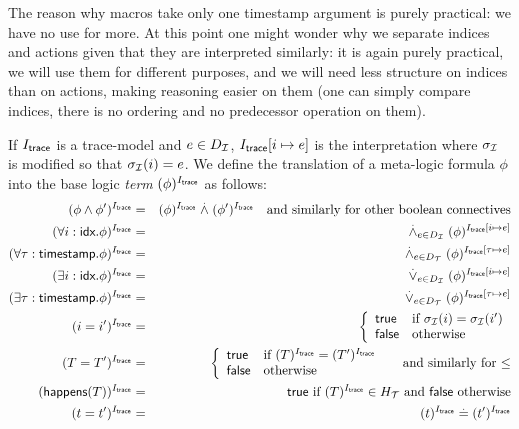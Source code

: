 The reason why macros take only one timestamp argument is purely practical:
we have no use for more. At this point one might wonder why we separate
indices and actions given that they are interpreted similarly: it is again
purely practical, we will use them for different purposes, and we will need
less structure on indices than on actions, making reasoning easier on them
(one can simply compare indices, there is no ordering and no predecessor
operation on them).

\begin{definition}
  If $I_{\textsf{trace}}$ is a trace-model and $e\in D_{\mathcal{I}}$,
  $I_{\textsf{trace}}[i\mapsto e]$ is the interpretation where $\sigma_{\mathcal{I}}$ is
  modified so that $\sigma_{\mathcal{I}}(i)=e$.
  We define the translation of a meta-logic formula $\phi$
  into the base logic \emph{term} $(\phi)^{I_{\textsf{trace}}}$
  as follows:
  \begin{eqnarray*}
    (\phi\wedge\phi')^{I_{\textsf{trace}}} &=& (\phi)^{I_{\textsf{trace}}} \stackrel{.}{\wedge} (\phi')^{I_{\textsf{trace}}}
    \quad \text{and similarly for other boolean connectives} \\
    (\forall i:\textsf{idx}. \phi)^{I_{\textsf{trace}}} &=&
    \stackrel{.}{\wedge}_{e\in D_{\mathcal{I}}} (\phi)^{I_{\textsf{trace}}[i\mapsto e]} \\
    (\forall \tau:\textsf{timestamp}. \phi)^{I_{\textsf{trace}}} &=&
    \stackrel{.}{\wedge}_{e\in D_{\mathcal{T}}} (\phi)^{I_{\textsf{trace}}[\tau\mapsto e]} \\
    (\exists i:\textsf{idx}. \phi)^{I_{\textsf{trace}}} &=&
    \stackrel{.}{\vee}_{e\in D_{\mathcal{I}}} (\phi)^{I_{\textsf{trace}}[i\mapsto e]} \\
    (\exists \tau:\textsf{timestamp}. \phi)^{I_{\textsf{trace}}} &=&
    \stackrel{.}{\vee}_{e\in D_{\mathcal{T}}} (\phi)^{I_{\textsf{trace}}[\tau\mapsto e]} \\
    (i=i')^{I_{\textsf{trace}}} &=&
    \left\{\begin{array}{ll}
      \mathsf{true} & \text{if } \sigma_{\mathcal{I}}(i)=\sigma_{\mathcal{I}}(i') \\
      \mathsf{false} & \text{otherwise}
    \end{array}\right. \\
    (T = T')^{I_{\textsf{trace}}} &=&
    \left\{\begin{array}{ll}
      \mathsf{true} & \text{if } (T)^{I_{\textsf{trace}}} = (T')^{I_{\textsf{trace}}} \\
      \mathsf{false} & \text{otherwise}
    \end{array}\right.
    \quad\text{ and similarly for $\leq$} \\
    (\textsf{happens}(T))^{I_{\textsf{trace}}} &=& \mathsf{true}
    \text{ if } (T)^{I_{\textsf{trace}}} \in H_{\mathcal{T}}
    \text{ and } \mathsf{false} \text{ otherwise}
    \\
    (t=t')^{I_{\textsf{trace}}} &=& (t)^{I_{\textsf{trace}}} \stackrel{.}{=} (t')^{I_{\textsf{trace}}}
  \end{eqnarray*}
\end{definition}

